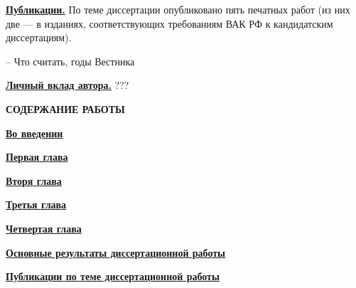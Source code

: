 \documentclass[12pt,a4paper]{article}
\newcommand{\afsection}[1]{\par \begin{center}\textbf{\MakeUppercase{#1}}\end{center}}
\newcommand{\afsubsection}[1]{\par \textbf{\underline{#1}}}
\begin{document}
\afsubsection{Публикации.} По теме диссертации опубликовано пять печатных работ (из них две --- в изданиях, соответствующих требованиям ВАК РФ к кандидатским диссертациям).

-- Что считать, годы Вестника

\afsubsection{Личный вклад автора.}
???

\afsection{Содержание работы}

\afsubsection{Во введении}

\afsubsection{Первая глава}

\afsubsection{Вторя глава}

\afsubsection{Третья глава}

\afsubsection{Четвертая глава}

\afsubsection{Основные результаты диссертационной работы}

\par
\begin{center}
\afsubsection{Публикации по теме диссертационной работы}
\end{center}
\end{document}
